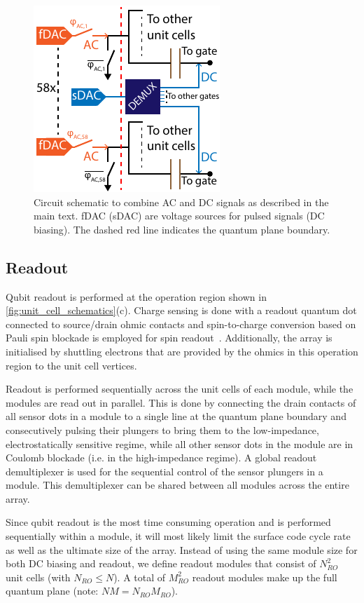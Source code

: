 \documentclass[aps,prl,reprint,superscriptaddress,floatfix]{revtex4-1}
\begin{document}
\begin{figure}[!b]
    \centering
    \includegraphics[height=0.35\textwidth]{Figure_5_DC-AC.pdf}
    \caption{Circuit schematic to combine AC and DC signals as described in the main text. fDAC (sDAC) are voltage sources for pulsed signals (DC biasing). The dashed red line indicates the quantum plane boundary.}
    \label{fig:dc+ac}
\end{figure}

\subsection{Readout}
Qubit readout is performed at the operation region shown in \autoref{fig:unit_cell_schematics}(c).
Charge sensing is done with a readout quantum dot connected to source/drain ohmic contacts and spin-to-charge conversion based on Pauli spin blockade is employed for spin readout~\cite{Zwanenburg2013}.
Additionally, the array is initialised by shuttling electrons that are provided by the ohmics in this operation region to the unit cell vertices.

Readout is performed sequentially across the unit cells of each module, while the modules are read out in parallel.
This is done by connecting the drain contacts of all sensor dots in a module to a single line at the quantum plane boundary and consecutively pulsing their plungers to bring them to the low-impedance, electrostatically sensitive regime, while all other sensor dots in the module are in Coulomb blockade (i.e. in the high-impedance regime).
A global readout demultiplexer is used for the sequential control of the sensor plungers in a module. This demultiplexer can be shared between all modules across the entire array.

Since qubit readout is the most time consuming operation and is performed sequentially within a module, it will most likely limit the surface code cycle rate as well as the ultimate size of the array.
Instead of using the same module size for both DC biasing and readout, we define readout modules that consist of $N_{RO}^2$ unit cells (with $N_{RO} \leq N$).
A total of $M_{RO}^2$ readout modules make up the full quantum plane (note: $NM = N_{RO}M_{RO}$).
\end{document}
